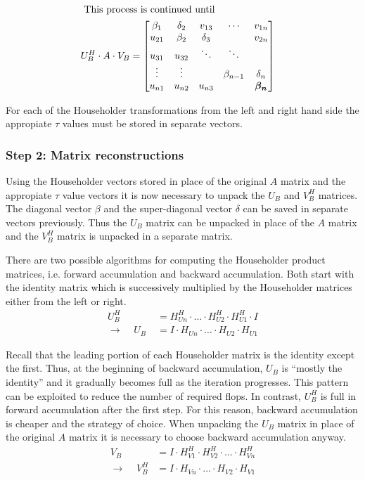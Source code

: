 \begin{align}
\intertext{
This process is continued until
}
U_B^H \cdot A \cdot V_B &=
\begin{bmatrix}
\beta_1 & \delta_2 & v_{13} & \cdots & v_{1n} \\
u_{21} & \beta_2 & \delta_3 &  & v_{2n} \\
u_{31} & u_{32} & \ddots & \ddots &  \\
\vdots & \vdots & & \beta_{n-1} & \delta_n \\
u_{n1} & u_{n2} & u_{n3} &  & \boldsymbol{\beta_n} \\
\end{bmatrix}
\end{align}

For each of the Householder transformations from the left and right
hand side the appropiate $\tau$ values must be stored in separate
vectors.

\subsubsection{Step 2: Matrix reconstructions}

Using the Householder vectors stored in place of the original $A$
matrix and the appropiate $\tau$ value vectors it is now necessary to
unpack the $U_B$ and $V_B^H$ matrices.  The diagonal vector $\beta$
and the super-diagonal vector $\delta$ can be saved in separate
vectors previously.  Thus the $U_B$ matrix can be unpacked in place of
the $A$ matrix and the $V_B^H$ matrix is unpacked in a separate
matrix.

\addvspace{12pt}

There are two possible algorithms for computing the Householder
product matrices, i.e. forward accumulation and backward accumulation.
Both start with the identity matrix which is successively multiplied
by the Householder matrices either from the left or right.
\begin{align}
U_B^H &= H^H_{Un}\cdot \ldots \cdot H^H_{U2}\cdot H^H_{U1}\cdot I\\
\rightarrow\;\;\;\; U_B\; &= I\cdot H_{Un}\cdot \ldots \cdot H_{U2}\cdot H_{U1}
\end{align}

Recall that the leading portion of each Householder matrix is the
identity except the first.  Thus, at the beginning of backward
accumulation, $U_B$ is ``mostly the identity'' and it gradually
becomes full as the iteration progresses.  This pattern can be
exploited to reduce the number of required flops.  In contrast,
$U_B^H$ is full in forward accumulation after the first step.  For
this reason, backward accumulation is cheaper and the strategy of
choice.  When unpacking the $U_B$ matrix in place of the original $A$
matrix it is necessary to choose backward accumulation anyway.
\begin{align}
V_B\; &= I\cdot H^H_{V1}\cdot H^H_{V2}\cdot \ldots \cdot H^H_{Vn}\\
\rightarrow\;\;\;\; V_B^H &= I\cdot H_{Vn}\cdot \ldots \cdot H_{V2}\cdot H_{V1}
\end{align}


